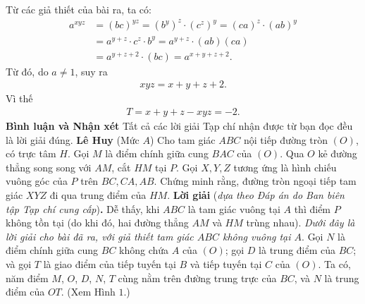 \begin{multicols}{2}
	\vskip 0.05cm
	Từ các giả thiết của bài ra, ta có:
	\begin{align*}
		{a^{xyz}} &= {\left( {bc} \right)^{yz}} = {\left( {{b^y}} \right)^z} \cdot {\left( {{c^z}} \right)^y} = {\left( {ca} \right)^z} \cdot {\left( {ab} \right)^y} \\[-0.5ex]
		&= {a^{y + z}} \cdot {c^z} \cdot {b^y} = {a^{y + z}} \cdot \left( {ab} \right)\left( {ca} \right) \\[-0.5ex]
		&= {a^{y + z + 2}} \cdot \left( {bc} \right) = {a^{x + y + z + 2}}.
	\end{align*}
	Từ đó, do $a \ne 1$, suy ra
	\begin{align*}
		xyz = x + y + z + 2.
	\end{align*}
	Vì thế
	\begin{align*}
		T = x + y + z - xyz = -2.
	\end{align*}
	\textbf{\color{thachthuctoanhoc}Bình luận và Nhận xét}
	\vskip 0.05cm
	Tất cả các lời giải Tạp chí nhận được từ bạn đọc đều là lời giải đúng.
	\vskip 0.05cm
	\hfill	\textbf{\color{thachthuctoanhoc}Lê Huy}
	\vskip 0.05cm
	{}
	(Mức $A$) Cho tam giác $ABC$ nội tiếp đường tròn $(O)$, có trực tâm $H$. Gọi $M$ là điểm chính giữa cung $BAC$ của $(O)$. Qua $O$ kẻ đường thẳng  song song với $AM$, cắt $HM$ tại $P$. Gọi $X,Y,Z$ tương ứng là hình chiếu vuông góc của $P$ trên $BC,CA,AB$. Chứng minh rằng, đường tròn ngoại tiếp tam giác $XYZ$ đi qua trung điểm của $HM.$
	\vskip 0.05cm
	\textbf{\color{thachthuctoanhoc}Lời giải} (\textit{dựa theo Đáp án do Ban biên tập Tạp chí cung cấp})\textbf{\color{thachthuctoanhoc}.}
	\vskip 0.05cm
	Dễ thấy, khi $ABC$ là tam giác vuông tại $A$ thì điểm $P$ không tồn tại (do khi đó, hai đường thẳng $AM$ và $HM$ trùng nhau). \textit{Dưới đây là lời giải cho bài đã ra, với giả thiết tam giác $ABC$ không vuông tại $A$}.
	\vskip 0.05cm
	Gọi $N$ là điểm chính giữa cung $BC$ không chứa $A$ của $(O)$; gọi $D$ là trung điểm của $BC$; và gọi $T$ là giao điểm của tiếp tuyến tại $B$ và tiếp tuyến tại $C$ của $(O)$. Ta có, năm điểm $M$, $O$, $D$, $N$, $T$ cùng nằm trên đường trung trực của $BC$, và $N$ là trung điểm của $OT$. (Xem Hình $1$.)
	\begin{figure}[H]
		\centering
		\vspace*{-10pt}
		\captionsetup{labelformat= empty, justification=centering}

\end{figure}
\end{multicols}
